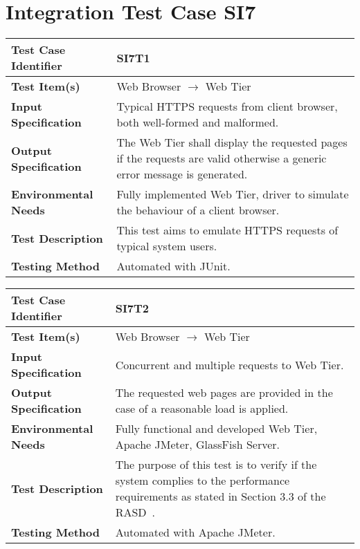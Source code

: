 \section{Integration Test Case SI7}

\begin{longtable}{p{} | p{}}
\hline
\textbf{Test Case Identifier} & SI7T1\\
\hline
\textbf{Test Item(s)} & Web Browser $\rightarrow$ Web Tier \\
\hline
\textbf{Input Specification} & Typical HTTPS requests from client browser, both well-formed and malformed. \\
\hline
\textbf{Output Specification} & The Web Tier shall display the requested pages if the requests are valid otherwise a generic error message is generated. \\
\hline
\textbf{Environmental Needs} & Fully implemented Web Tier, driver to simulate the behaviour of a client browser. \\
\hline
\textbf{Test Description} & This test aims to emulate HTTPS requests of typical system users. \\
\hline
\textbf{Testing Method} & Automated with JUnit. \\
\hline
\end{longtable}

\begin{longtable}{p{} | p{}}
\hline
\textbf{Test Case Identifier} & SI7T2\\
\hline
\textbf{Test Item(s)} & Web Browser $\rightarrow$ Web Tier \\
\hline
\textbf{Input Specification} & Concurrent and multiple requests to Web Tier. \\
\hline
\textbf{Output Specification} & The requested web pages are provided in the case of a reasonable load is applied. \\
\hline
\textbf{Environmental Needs} & Fully functional and developed Web Tier, Apache JMeter, GlassFish Server. \\
\hline
\textbf{Test Description} & The purpose of this test is to verify if the system complies to the performance requirements as stated in Section 3.3 of the RASD~\cite{rasd}. \\
\hline
\textbf{Testing Method} & Automated with Apache JMeter. \\
\hline
\end{longtable}